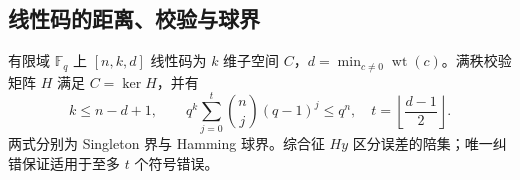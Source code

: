 \documentclass[../main.tex]{subfiles}
\begin{document}
\subsection{线性码的距离、校验与球界}
有限域 $\mathbb F_q$ 上 $[n,k,d]$ 线性码为 $k$ 维子空间 $C$，$d=\min_{c\ne0}\operatorname{wt}(c)$。满秩校验矩阵 $H$ 满足 $C=\ker H$，并有
\[
k\le n-d+1,\qquad
q^k\sum_{j=0}^{t}\binom nj(q-1)^j\le q^n,
\quad t=\left\lfloor\frac{d-1}{2}\right\rfloor.
\]
两式分别为 Singleton 界与 Hamming 球界。综合征 $Hy$ 区分误差的陪集；唯一纠错保证适用于至多 $t$ 个符号错误。
\clearpage
\end{document}
